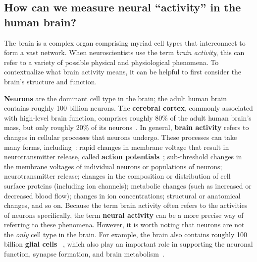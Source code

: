 \documentclass[runningheads]{llncs}
\begin{document}
\subsection{How can we measure neural ``activity'' in the human
  brain? \label{sec:activity}}

The brain is a complex organ comprising myriad cell types that
interconnect to form a vast network.  When neuroscientists use the term
\textit{brain activity}, this can refer to a variety of possible
physical and physiological phenomena.  To contextualize what brain
activity means, it can be helpful to first consider the brain's structure
and function.

\textbf{Neurons} are the dominant cell type in the brain; the adult
human brain contains roughly 100 billion neurons.  The
\textbf{cerebral cortex}, commonly associated with high-level brain
function, comprises roughly 80\% of the adult human brain's mass, but
only roughly 20\% of its neurons~\citep{Herc09}.  In general,
\textbf{brain activity} refers to changes in cellular processes that
neurons undergo.  These processes can take many forms,
including~\citep{KandEtal00}: rapid changes in membrane voltage that
result in neurotransmitter release, called \textbf{action
  potentials}~\citep{HodgHuxl52}; sub-threshold changes in the
membrane voltages of individual neurons or populations of neurons;
neurotransmitter release; changes in the composition or distribution
of cell surface proteins (including ion channels); metabolic changes
(such as increased or decreased blood flow); changes in ion
concentrations; structural or anatomical changes, and so on.  Because
the term brain activity often refers to the activities of neurons
specifically, the term \textbf{neural activity} can be a more precise
way of referring to these phenomena.  However, it is worth noting that
neurons are not the \textit{only} cell type in the brain.  For
example, the brain also contains roughly 100 billion \textbf{glial
  cells}~\citep{AzevEtal09, MotaHerc14} , which also play an important
role in supporting the neuronal function, synapse formation, and brain
metabolism~\cite{Barr08}.
\end{document}
